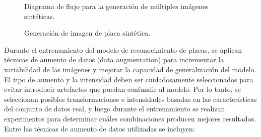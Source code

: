 \begin{figure}[h]
	\centering
	
	\caption{Diagrama de flujo para la generación de múltiples imágenes sintéticas.}
	\label{fig:diagrama-flujo-generacion-multiples-placas}
\end{figure}

\begin{figure}[hb]
	\centering
	
	\caption{Generación de imagen de placa sintética.}
	\label{fig:diagrama-flujo-generador-placas}
\end{figure}

Durante el entrenamiento del modelo de reconocimiento de placas, se aplican
técnicas de aumento de datos (data augmentation) para incrementar la variabilidad
de las imágenes y mejorar la capacidad de generalización del modelo. El tipo de
aumento y la intensidad deben ser cuidadosamente seleccionados para evitar
introducir artefactos que puedan confundir al modelo. Por lo tanto, se seleccionan
posibles transformaciones e intensidades basadas en las características del conjunto de datos real,
y luego durante el entrenamiento se realizan experimentos para determinar cuáles combinaciones
producen mejores resultados. Entre las técnicas de aumento de datos utilizadas se incluyen:

